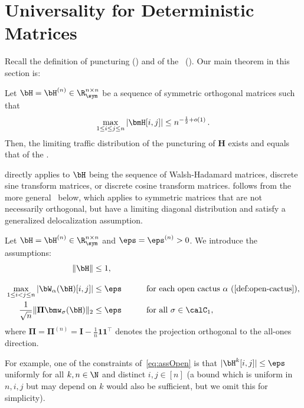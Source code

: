 \section{Universality for Deterministic Matrices}
\label{sec:universality}

Recall the definition of puncturing () and
of the \rrom~().
Our main theorem in this section is:

\begin{theorem}
    \label{thm:universality-orthogonal}
    Let $\bH = \bH^{(n)}\in\R_{\sym}^{n\times n}$ be a sequence of symmetric orthogonal matrices such that
    \begin{align}
        \max_{1\le i\le j\le n} |\bmH[i,j]|\le n^{-\frac 12 + o(1)}\,.\label{eq:delocOrtho}
    \end{align}
    Then, the limiting traffic distribution of the puncturing of $\bm H$ 
    exists and equals that of the \rrom.
\end{theorem}

\noindent {}
directly applies to $\bH$ being the sequence
of Walsh-Hadamard matrices, discrete sine
transform matrices, or discrete cosine 
transform matrices.
follows from the more general~ below, which applies
to symmetric matrices that are not
necessarily orthogonal, but have a
limiting diagonal distribution and 
satisfy
a generalized delocalization assumption.

\begin{assumption}
    \label{assumption:punctured}
    Let $\bH=\bH^{(n)} \in \R^{n \times n}_{\sym}$ and $\eps = \eps^{(n)}>0$.
    We introduce the assumptions:
    \begin{alignat}{2}
        \|\bH\|&\le 1, &&\label{eq:assNorm}\\[3.5mm]
        \max_{1\le i<j\le n} |\bW_\alpha(\bH)[i,j]|&\le \eps&\qquad&\text{for each open cactus $\alpha$ (\Cref{def:open-cactus})}, \label{eq:assOpen}\\
        \frac 1 {\sqrt n}\|\mathbf \Pi \bmw_\sigma(\bH) \|_2&\le \eps&\qquad&\text{for all $\sigma\in\calC_1$}, \label{eq:assOne}
    \end{alignat}
    where $\mathbf \Pi=\mathbf \Pi^{(n)} = \mathbf I - \frac 1n \bm 1 \bm 1^\top$ denotes the projection orthogonal to the all-ones direction. 
\end{assumption}

\noindent For example, one of the constraints of~\cref{eq:assOpen} is that $|\bH^k[i,j]| \leq \eps$ uniformly for all $k,n \in \N$ and distinct $i,j \in [n]$ (a bound which is uniform in $n,i,j$ but may depend on $k$ would also be sufficient, but we omit this for simplicity).




